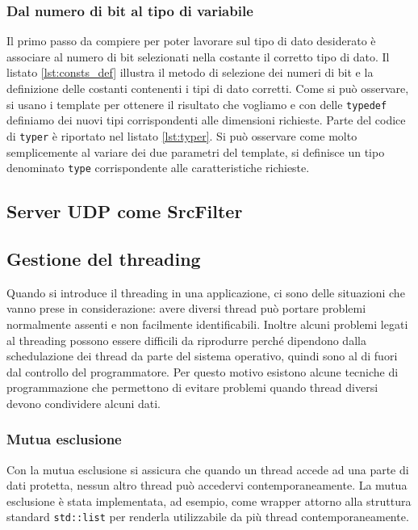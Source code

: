 \subsubsection{Dal numero di bit al tipo di variabile}
Il primo passo da compiere per poter lavorare sul tipo di dato desiderato \`e
associare al numero di bit selezionati nella costante il corretto tipo di dato.
Il listato \ref{lst:consts_def} illustra il metodo di selezione dei numeri di bit e
la definizione delle costanti contenenti i tipi di dato corretti. Come si pu\`o
osservare, si usano i template per ottenere il risultato che vogliamo e con
delle \texttt{typedef} definiamo dei nuovi tipi corrispondenti alle dimensioni
richieste. Parte del codice di \texttt{typer} \`e riportato nel listato
\ref{lst:typer}. Si pu\`o osservare come molto semplicemente al variare dei due
parametri del template, si definisce un tipo denominato \texttt{type}
corrispondente alle caratteristiche richieste.





\subsection{Server UDP come SrcFilter}
\subsection{Gestione del threading}
Quando si introduce il threading in una applicazione, ci sono delle situazioni
che vanno prese in considerazione: avere diversi thread pu\`o portare problemi
normalmente assenti e non facilmente identificabili. Inoltre alcuni problemi
legati al threading possono essere difficili da riprodurre perch\'e  dipendono
dalla schedulazione dei thread da parte del sistema operativo, quindi sono al di
fuori dal controllo del programmatore. Per questo motivo esistono alcune
tecniche di programmazione che permettono di evitare problemi quando thread
diversi devono condividere alcuni dati.

\subsubsection{Mutua esclusione}

Con la mutua esclusione si assicura che quando un thread accede ad una parte di
dati protetta, nessun altro thread pu\`o accedervi contemporaneamente. La mutua
esclusione \`e stata implementata, ad esempio, come wrapper attorno alla
struttura standard \texttt{std::list} per renderla utilizzabile da pi\`u thread
contemporaneamente.

